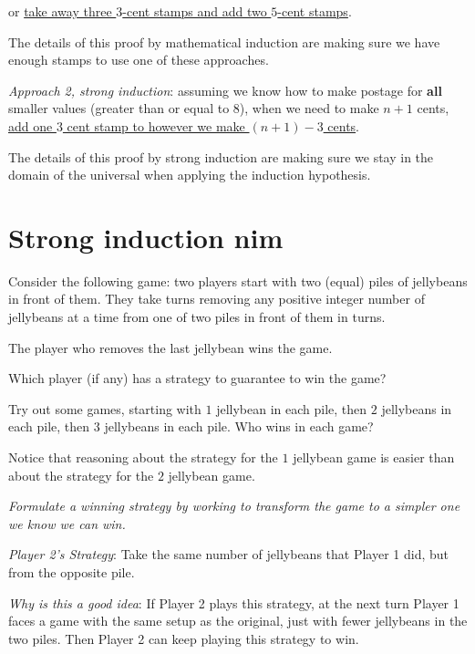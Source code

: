 \documentclass[12pt, oneside]{article}
\begin{document}
\vspace{-10pt}
or \underline{take away three $3$-cent stamps and add two $5$-cent stamps}.

\vspace{-10pt}
The details of this proof by mathematical induction
are making sure we have enough 
stamps to use one of these approaches.

{\it Approach 2, strong induction}: assuming we know how to make postage
for {\bf all} smaller values (greater than or equal to $8$), when
we need to make $n+1$ cents, \underline{add one $3$ cent stamp to 
however we make $(n+1) - 3$ cents}.

\vspace{-10pt}
The details of this proof by strong induction are making sure we 
stay in the domain of the universal when applying the induction hypothesis.
 \vfill
\section*{Strong induction nim}


Consider the following game: two players start with 
two (equal) piles of jellybeans in front of them.
They take turns removing any positive integer number
of jellybeans at a time from one of two piles in 
front of them in turns.

The player who removes the last jellybean wins the game.

Which player (if any) has a strategy to guarantee
to win the game?


Try out some games, starting with $1$ jellybean in each pile,
then $2$ jellybeans in each pile, then $3$ jellybeans in each pile.
Who wins in each game?

\vspace{200pt}


Notice that reasoning about the strategy for the $1$ jellybean 
game is easier than about the strategy for the $2$ jellybean game.

{\it Formulate a winning strategy by working to 
transform the game to a simpler one we know we can win.}

\newpage

{\it Player 2's Strategy}: Take the same number of jellybeans that Player 1 did, 
but from the opposite pile. 


{\it Why is this a good idea}: If Player 2 plays this strategy, at the next turn
Player 1 faces a game with the same setup as the original, just with fewer
jellybeans in the two piles. Then Player 2 can keep playing this strategy to win.
\end{document}
